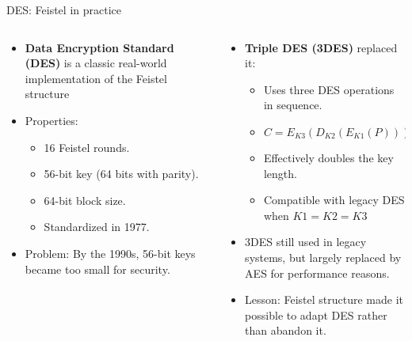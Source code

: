 \documentclass[aspectratio=169, lualatex, handout]{beamer}
\begin{document}
\begin{frame}{DES: Feistel in practice}
	\begin{columns}[c]
		\begin{column}{0.5\textwidth}
			\begin{itemize}
				\item \textbf{Data Encryption Standard (DES)} is a classic real-world implementation of the Feistel structure
				\item Properties:
				      \begin{itemize}
					      \item 16 Feistel rounds.
					      \item 56-bit key (64 bits with parity).
					      \item 64-bit block size.
					      \item Standardized in 1977.
				      \end{itemize}
				\item Problem: By the 1990s, 56-bit keys became too small for security.
			\end{itemize}
		\end{column}
		\begin{column}{0.5\textwidth}
			\begin{itemize}
				\item \textbf{Triple DES (3DES)} replaced it:
				      \begin{itemize}
					      \item Uses three DES operations in sequence.
					      \item $C = E_{K3}(D_{K2}(E_{K1}(P)))$
					      \item Effectively doubles the key length.
					      \item Compatible with legacy DES when $K1 = K2 = K3$
				      \end{itemize}
				\item 3DES still used in legacy systems, but largely replaced by AES for performance reasons.
				\item Lesson: Feistel structure made it possible to adapt DES rather than abandon it.
			\end{itemize}
		\end{column}
	\end{columns}
\end{frame}
\end{document}
